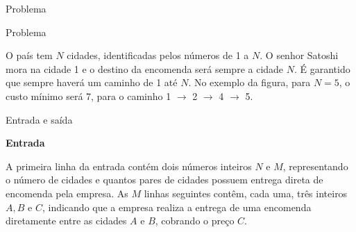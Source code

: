 \begin{frame}[fragile]{Problema}

    \begin{figure}[!ht]
    \end{figure}

\end{frame}

\begin{frame}[fragile]{Problema}

O país tem $N$ cidades, identificadas pelos números de 1 a $N$. O senhor Satoshi mora na cidade 1
e o destino da encomenda será sempre a cidade $N$. É garantido que sempre haverá um caminho de 1
até $N$. No exemplo da figura, para $N=5$, o custo mínimo será 7, para o caminho 1 $\to$ 2 $\to$ 4
$\to$ 5.

\end{frame}

\begin{frame}[fragile]{Entrada e saída}

\textbf{Entrada}

A primeira linha da entrada contém dois números inteiros $N$ e $M$, representando o número de
cidades e quantos pares de cidades possuem entrega direta de encomenda pela empresa. As $M$ linhas
seguintes contêm, cada uma, três inteiros $A, B$ e $C$, indicando que a empresa realiza a entrega
de uma encomenda diretamente entre as cidades $A$ e $B$, cobrando o preço $C$.

\end{frame}

